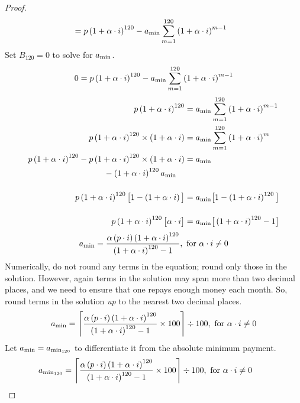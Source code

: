 \documentclass[12pt,letterpaper,oneside]{article}
\theoremstyle{remark} %
\begin{document}
\begin{proof}
\begin{align*}
	&=p\left(1+\alpha\cdot i\right)^{120}-a_{\rm{min}}\sum_{m=1}^{120}\left(1+\alpha\cdot i\right)^{m-1}
	\end{align*}
	Set $B_{120}=0$ to solve for $a_{\rm{min}}$.
	\begin{gather*}
	0=p\left(1+\alpha\cdot i\right)^{120}-a_{\rm{min}}\sum_{m=1}^{120}\left(1+\alpha\cdot i\right)^{m-1}
	\end{gather*}
	\vspace{-12pt} %
	\begin{align*}
	p\left(1+\alpha\cdot i\right)^{120}&=a_{\rm{min}}\sum_{m=1}^{120}\left(1+\alpha\cdot i\right)^{m-1}\\
	p\left(1+\alpha\cdot i\right)^{120}\times\left(1+\alpha\cdot i\right)&=a_{\rm{min}}\sum_{m=1}^{120}\left(1+\alpha\cdot i\right)^{m}\\
	p\left(1+\alpha\cdot i\right)^{120}-p\left(1+\alpha\cdot i\right)^{120}\times\left(1+\alpha\cdot i\right)&=a_{\rm{min}}\nonumber\\
	\begin{split}
	&\quad-\left(1+\alpha\cdot i\right)^{120}a_{\rm{min}}
	\end{split}\\[12pt]
	p\left(1+\alpha\cdot i\right)^{120}\big[1-\left(1+\alpha\cdot i\right)\big]&=a_{\rm{min}}\big[1-\left(1+\alpha\cdot i\right)^{120}\big]\\[12pt]
	p\left(1+\alpha\cdot i\right)^{120}\big[\alpha\cdot i\big]&=a_{\rm{min}}\big[\left(1+\alpha\cdot i\right)^{120}-1\big]
	\end{align*}
	\begin{gather*}
	a_{\rm{min}}=\frac{\alpha\left(p\cdot i\right)\left(1+\alpha\cdot i\right)^{120}}{\left(1+\alpha\cdot i\right)^{120}-1},\mbox{ for }\alpha\cdot i\neq 0
	\end{gather*}
	Numerically, do not round any terms in the equation; round only those in the solution.
	However, again terms in the solution may span more than two decimal places, and we need to ensure that one repays enough money each month. So, round terms in the solution \textit{up} to the nearest two decimal places.
	\begin{gather*}
	a_{\rm{min}}=\left\lceil{\frac{\alpha\left(p\cdot i\right)\left(1+\alpha\cdot i\right)^{120}}{\left(1+\alpha\cdot i\right)^{120}-1}\times 100}\right\rceil\div 100,\mbox{ for }\alpha\cdot i\neq 0
	\end{gather*}
	Let $a_{\rm{min}}=a_{\rm{min_{120}}}$ to differentiate it from the absolute minimum payment.
	\begin{gather*}
	a_{\rm{min_{120}}}=\left\lceil{\frac{\alpha\left(p\cdot i\right)\left(1+\alpha\cdot i\right)^{120}}{\left(1+\alpha\cdot i\right)^{120}-1}\times 100}\right\rceil\div 100,\mbox{ for }\alpha\cdot i\neq 0
	\tag*{\qedhere}
	\end{gather*}	
	\end{proof}
\end{document}
